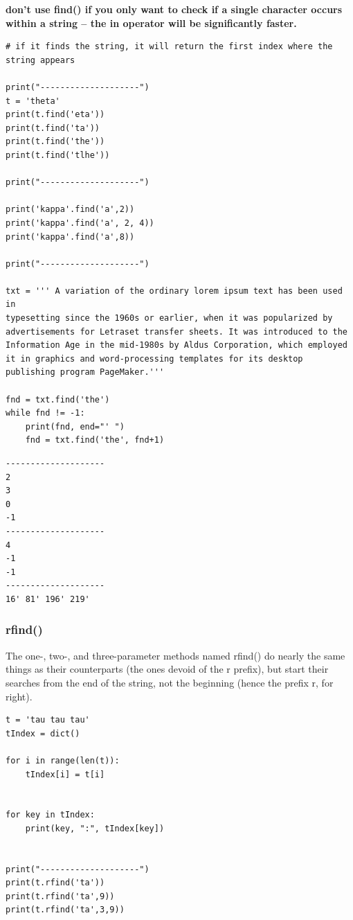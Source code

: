 \documentclass[11pt]{article}
\begin{document}
\textbf{don’t use find() if you only want to check if a single character
occurs within a string – the in operator will be significantly faster.}

\begin{verbatim}
# if it finds the string, it will return the first index where the string appears 

print("--------------------")
t = 'theta'
print(t.find('eta'))
print(t.find('ta'))
print(t.find('the'))
print(t.find('tlhe'))

print("--------------------")

print('kappa'.find('a',2))
print('kappa'.find('a', 2, 4))
print('kappa'.find('a',8))

print("--------------------")

txt = ''' A variation of the ordinary lorem ipsum text has been used in
typesetting since the 1960s or earlier, when it was popularized by
advertisements for Letraset transfer sheets. It was introduced to the
Information Age in the mid-1980s by Aldus Corporation, which employed
it in graphics and word-processing templates for its desktop
publishing program PageMaker.'''

fnd = txt.find('the')
while fnd != -1:
    print(fnd, end="' ")
    fnd = txt.find('the', fnd+1)
\end{verbatim}

\begin{verbatim}
--------------------
2
3
0
-1
--------------------
4
-1
-1
--------------------
16' 81' 196' 219' 
\end{verbatim}

\subsubsection{rfind()}
\label{sec:orgd73860d}
The one-, two-, and three-parameter methods named rfind() do nearly
the same things as their counterparts (the ones devoid of the r
prefix), but start their searches from the end of the string, not the
beginning (hence the prefix r, for right).

\begin{verbatim}
t = 'tau tau tau'
tIndex = dict()

for i in range(len(t)):
    tIndex[i] = t[i]


for key in tIndex:
    print(key, ":", tIndex[key])


print("--------------------")
print(t.rfind('ta'))
print(t.rfind('ta',9))
print(t.rfind('ta',3,9))
\end{verbatim}
\end{document}
